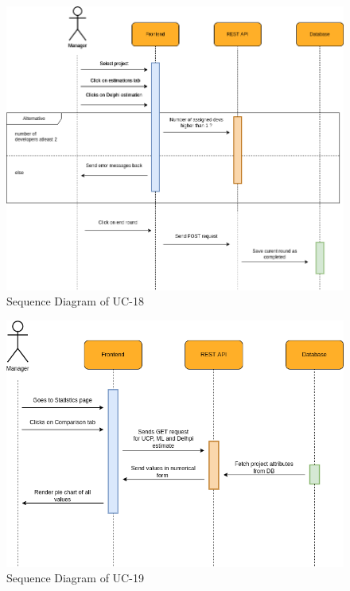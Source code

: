 \begin{figure}[H]
    \centering
    \includegraphics[scale=0.5]{./diagrams/sequence/seq-18.png}
    \caption{Sequence Diagram of UC-18}
    \label{fig:seq-18}
    
\end{figure}


\begin{figure}[H]
    \centering
    \includegraphics[scale=0.5]{./diagrams/sequence/seq-19.png}
    \caption{Sequence Diagram of UC-19}
    \label{fig:seq-19}
    
\end{figure}

